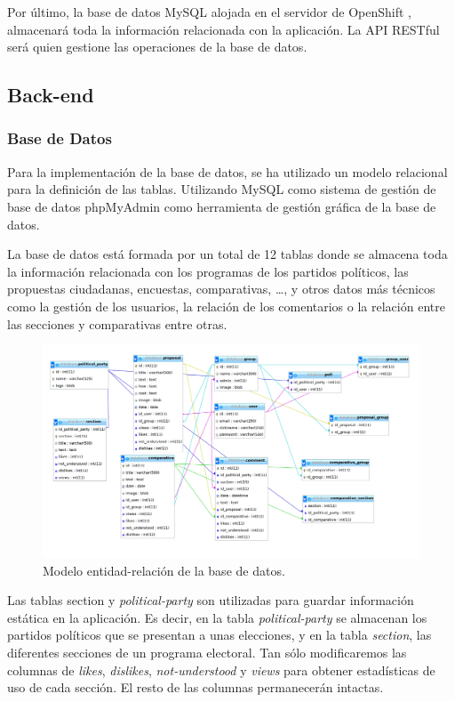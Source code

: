 Por último, la base de datos MySQL alojada en el servidor de OpenShift \cite{ref:OpenShift}, almacenará toda la información relacionada con la aplicación. La API RESTful será quien gestione las operaciones de la base de datos.

\subsection{Back-end}

\subsubsection{Base de Datos}\label{sssec:database}
Para la implementación de la base de datos, se ha utilizado un modelo relacional para la definición de las tablas. Utilizando MySQL \cite{ref:MySQL} como sistema de gestión de base de datos phpMyAdmin \cite{ref:phpMyAdmin} como herramienta de gestión gráfica de la base de datos.

La base de datos está formada por un total de 12 tablas donde se almacena toda la información relacionada con los programas de los partidos políticos, las propuestas ciudadanas, encuestas, comparativas, …, y otros datos más técnicos como la gestión de los usuarios, la relación de los comentarios o la relación entre las secciones y comparativas entre otras.

\begin{figure}[H]
\centering
\includegraphics[keepaspectratio, scale=0.30]{Media/Captures/database.png}
\caption{Modelo entidad-relación de la base de datos.}
\label{fig:ermodel}
\end{figure}

Las tablas section y \textit{political-party} son utilizadas para guardar información estática en la aplicación. Es decir, en la tabla \textit{political-party} se almacenan los partidos políticos que se presentan a unas elecciones, y en la tabla \textit{section}, las diferentes secciones de un programa electoral. Tan sólo modificaremos las columnas de \textit{likes}, \textit{dislikes}, \textit{not-understood} y \textit{views} para obtener estadísticas de uso de cada sección. El resto de las columnas permanecerán intactas.

